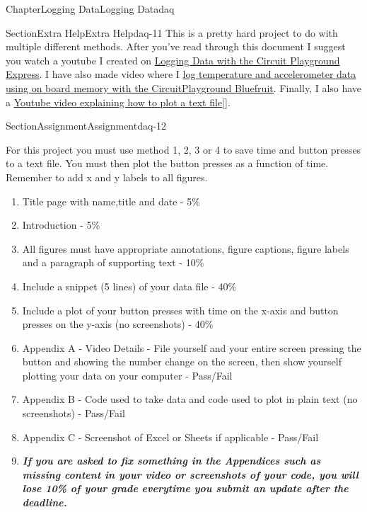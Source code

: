 \documentclass[oneside,10pt,]{book}
\newcommand{\xreffont}{\relax}
\newcommand{\linkhilite}[1]{\underline{#1}}
\newcommand{\alert}[1]{\textbf{\textit{#1}}}
\numberwithin{equation}{section}
\begin{document}
\begin{chapterptx}{Chapter}{Logging Data}{}{Logging Data}{}{}{daq}
%
\begin{sectionptx}{Section}{Extra Help}{}{Extra Help}{}{}{daq-11}
This is a pretty hard project to do with multiple different methods. After you've read through this document I suggest you watch a youtube I created on \href{https://youtu.be/yX0zeIfn2j4}{\linkhilite{Logging Data with the Circuit Playground Express}}. I have also made video where I \href{https://www.youtube.com/watch?v=Vc7_KxRnORI}{\linkhilite{log temperature and accelerometer data using on board memory with the CircuitPlayground Bluefruit}}. Finally, I also have a \href{https://www.youtube.com/watch?v=tJOz-ty-2ec\&list=PL_D7_GvGz-v1RsDs_OdNW65qRjEjmpfQx\&index=12}{\linkhilite{Youtube video explaining how to plot a text file}}\hyperlink{youtube}{\linkhilite{[{\xreffont 50}]}}.%
\end{sectionptx}
%
%
\typeout{************************************************}
\typeout{************************************************}
%
\begin{sectionptx}{Section}{Assignment}{}{Assignment}{}{}{daq-12}
\begin{introduction}{}%
For this project you must use method 1, 2, 3 or 4 to save time and button presses to a text file. You must then plot the button presses as a function of time. Remember to add x and y labels to all figures.%
%
\begin{enumerate}
\item{}Title page with name,title and date - 5\%%
\item{}Introduction - 5\%%
\item{}All figures must have appropriate annotations, figure captions, figure labels and a paragraph of supporting text - 10\%%
\item{}Include a snippet (5 lines) of your data file - 40\%%
\item{}Include a plot of your button presses with time on the x-axis and button presses on the y-axis (no screenshots) - 40\%%
\item{}Appendix A - Video Details - File yourself and your entire screen pressing the button and showing the number change on the screen, then show yourself plotting your data on your computer - Pass\slash{}Fail%
\item{}Appendix B - Code used to take data and code used to plot in plain text (no screenshots) - Pass\slash{}Fail%
\item{}Appendix C - Screenshot of Excel or Sheets if applicable - Pass\slash{}Fail%
\item{}\alert{If you are asked to fix something in the Appendices such as missing content in your video or screenshots of your code, you will lose 10\% of your grade everytime you submit an update after the deadline.}%
\end{enumerate}
\end{introduction}%
\end{sectionptx}
\end{chapterptx}
\end{document}
